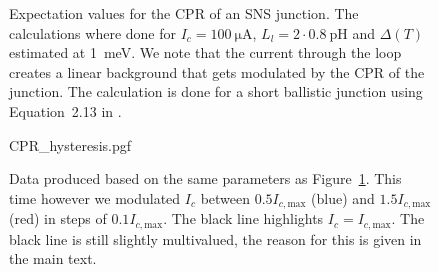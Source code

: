\begin{figure}[ht!]
	\centering
	
	\caption{Expectation values for the CPR of an SNS junction. The calculations where done for $I_c=\qty{100}{\micro\ampere}$, $L_l=2 \cdot \qty{0.8}{\pico\henry}$ and $\Delta(T)$ estimated at \qty{1}{\milli\electronvolt}. We note that the current through the loop creates a linear background that gets modulated by the CPR of the junction. The calculation is done for a short ballistic junction using Equation~2.13 in \cite{vermeerSTMbasedScanningSQUID2021}.}
	\label{fig:CP3.5A-analytical-prediction}
\end{figure}

\begin{figure}
	\centering
	{CPR_hysteresis.pgf}
	\caption{Data produced based on the same parameters as Figure~\ref{fig:CP3.5A-analytical-prediction}. This time however we modulated $I_c$ between $0.5I_{c,\text{max}}$ (blue) and $1.5I_{c,\text{max}}$ (red) in steps of $0.1I_{c,\text{max}}$. The black line highlights $I_c=I_{c,\text{max}}$. The black line is still slightly multivalued, the reason for this is given in the main text.}
	\label{fig:CPR-hysteresis}
\end{figure}

